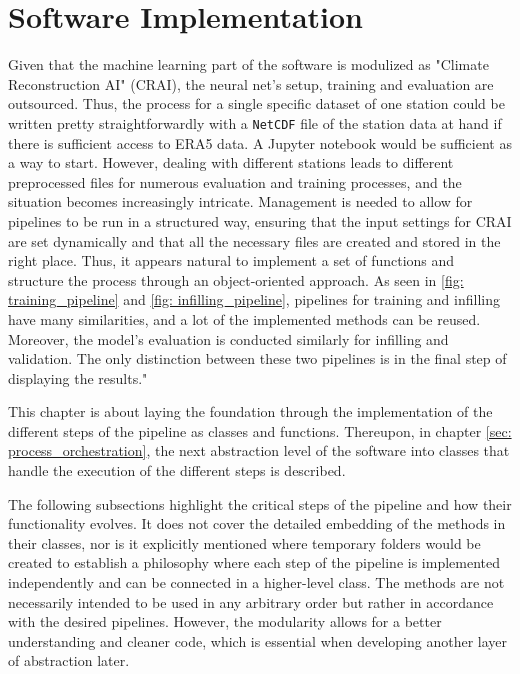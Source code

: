\section{Software Implementation}
\label{sec: implementation}

\newcommand{\code}[1]{\texttt{#1}}

Given that the machine learning part of the software is modulized as "Climate Reconstruction AI" (CRAI), the neural net's setup, training and evaluation are outsourced.
Thus, the process for a single specific dataset of one station could be written pretty straightforwardly with a \code{NetCDF} file of the station data at hand if there is sufficient access to ERA5 data.
A Jupyter notebook would be sufficient as a way to start.
However, dealing with different stations leads to different preprocessed files for numerous evaluation and training processes, and the situation becomes increasingly intricate.
Management is needed to allow for pipelines to be run in a structured way, ensuring that the input settings for CRAI are set dynamically and that all the necessary files are created and stored in the right place.
Thus, it appears natural to implement a set of functions and structure the process through an object-oriented approach.
As seen in \autoref{fig: training_pipeline} and \autoref{fig: infilling_pipeline}, pipelines for training and infilling have many similarities, and a lot of the implemented methods can be reused.
Moreover, the model's evaluation is conducted similarly for infilling and validation.
The only distinction between these two pipelines is in the final step of displaying the results."

This chapter is about laying the foundation through the implementation of the different steps of the pipeline as classes and functions. Thereupon, in chapter \autoref{sec: process_orchestration}, the next abstraction level of the software into classes that handle the execution of the different steps is described.

The following subsections highlight the critical steps of the pipeline and how their functionality evolves.
It does not cover the detailed embedding of the methods in their classes, nor is it explicitly mentioned where temporary folders would be created to establish a philosophy where each step of the pipeline is implemented independently and can be connected in a higher-level class.
The methods are not necessarily intended to be used in any arbitrary order but rather in accordance with the desired pipelines.
However, the modularity allows for a better understanding and cleaner code, which is essential when developing another layer of abstraction later.

